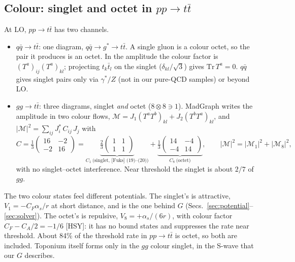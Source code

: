 \documentclass[11pt]{article}
\newcommand{\Fuks}{[Fuks]}
\newcommand{\HSY}{[HSY]}
\begin{document}
\subsection{Colour: singlet and octet in $pp\to t\bar t$}
At LO, $pp\to t\bar t$ has two channels.
\begin{itemize}
  \item $q\bar q\to t\bar t$: one diagram, $q\bar q\to g^*\to t\bar t$. A single gluon is a colour octet, so the pair it produces is
        an octet. In the amplitude the colour factor is $(T^a)_{ij}(T^a)_{kl}$; projecting $t_k\bar t_l$ on the singlet
        ($\delta_{kl}/\sqrt3$) gives $\mathrm{Tr}\,T^a=0$. $q\bar q$ gives singlet pairs only via $\gamma^*/Z$ (not in our pure-QCD
        samples) or beyond LO.
  \item $gg\to t\bar t$: three diagrams, singlet \emph{and} octet ($8\otimes8\ni1$). MadGraph writes the amplitude in two colour
        flows, $\mathcal M=J_1(T^aT^b)_{kl}+J_2(T^bT^a)_{kl}$, and $|\mathcal M|^2=\sum_{ij}J_i^*\,C_{ij}\,J_j$ with
        $$
        C=\tfrac13\begin{pmatrix}16&-2\\-2&16\end{pmatrix}
         =\underbrace{\tfrac23\begin{pmatrix}1&1\\1&1\end{pmatrix}}_{C_1\ \text{(singlet, \Fuks\ (19)--(20))}}
         +\underbrace{\tfrac13\begin{pmatrix}14&-4\\-4&14\end{pmatrix}}_{C_8\ \text{(octet)}},
        \qquad |\mathcal M|^2=|\mathcal M_1|^2+|\mathcal M_8|^2,
        $$
        with no singlet--octet interference. Near threshold the singlet is about $2/7$ of $gg$.
\end{itemize}
The two colour states feel different potentials. The singlet's is attractive, $V_1=-C_F\alpha_s/r$ at short distance, and is the one
behind $G$ (Secs.~\ref{sec:potential}--\ref{sec:solver}). The octet's is repulsive, $V_8=+\alpha_s/(6r)$, with colour factor
$C_F-C_A/2=-1/6$ \HSY: it has no bound states and suppresses the rate near threshold. About 84\% of the threshold rate in
$pp\to t\bar t$ is octet, so both are included. Toponium itself forms only in the $gg$ colour singlet, in the S-wave that our $G$
describes.
\end{document}
